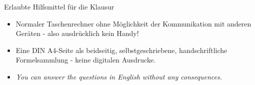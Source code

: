 \documentclass[a4paper, 9pt]{scrartcl}\usepackage[]{graphicx}\usepackage[]{xcolor}
\begin{document}
\date{Sommersemester 2024}
\maketitle
{}
\thispagestyle{empty}
\clearpage

\begin{graybox}{Erlaubte Hilfsmittel für die Klausur}
  \vspace{1Ex}
  \begin{itemize}
  \item Normaler Taschenrechner ohne Möglichkeit der Kommunikation mit anderen
    Geräten - also ausdrücklich kein Handy!
  \item Eine DIN A4-Seite als beidseitig, selbstgeschriebene,
    handschriftliche Formelsammlung - keine digitalen Ausdrucke. 
  \item \textit{You can answer the questions in English without any consequences.}  
  \end{itemize}
\end{graybox}
\vfill
\end{document}
